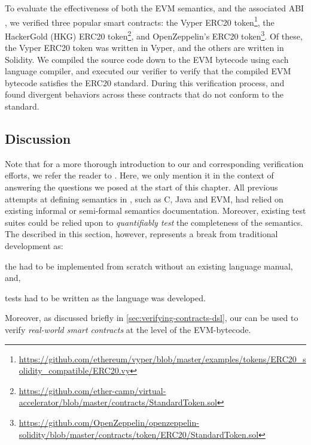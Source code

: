 To evaluate the effectiveness of both the EVM semantics, and the
associated ABI \DSL{}, we verified three popular smart contracts:
the Vyper ERC20 token\footnote{\url{https://github.com/ethereum/vyper/blob/master/examples/tokens/ERC20_solidity_compatible/ERC20.vy}},
the HackerGold (HKG) ERC20 token\footnote{\url{https://github.com/ether-camp/virtual-accelerator/blob/master/contracts/StandardToken.sol}},
and OpenZeppelin's ERC20 token\footnote{\url{https://github.com/OpenZeppelin/openzeppelin-solidity/blob/master/contracts/token/ERC20/StandardToken.sol}}.
Of these, the Vyper ERC20 token was written in Vyper, and the others are written in Solidity.
We compiled the source code down to the EVM bytecode using each language compiler,
and executed our verifier to verify that the compiled EVM bytecode satisfies the
ERC20 standard.
During this verification process, and found divergent behaviors across these contracts that do not conform to the standard.

\subsection{Discussion}
Note that for a more thorough introduction to our \DSL{} and corresponding
verification efforts, we refer the reader to \cite{HildenbrandtCSF18,ParkFSE18}.
Here, we only mention it in the context of answering
the questions we posed at the start of this chapter. All previous
attempts at defining semantics in \K{}, such as C, Java and EVM,
had relied on existing informal or semi-formal semantics documentation.
Moreover, existing test suites could be relied upon to \emph{quantifiably test}
the completeness of the semantics. The \DSL{} described in this section,
however, represents a break from traditional \K{} development as:
\begin{enumerate*}[label=(\alph*)]
  \item the \DSL{} had to be implemented from scratch without an existing
     language manual, and,
   \item tests had to be written as the language was developed.
\end{enumerate*}
Moreover, as discussed briefly in \ref{sec:verifying-contracts-dsl},
our \DSL{} can be used to verify \emph{real-world smart contracts} at the
level of the EVM-bytecode.

